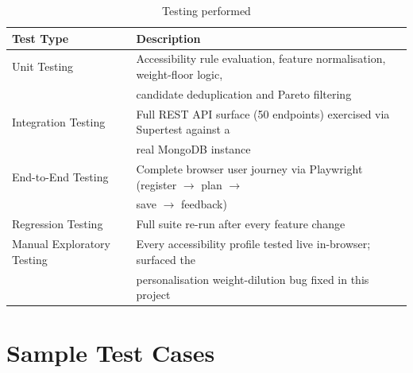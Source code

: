 \documentclass[12pt,a4paper]{report}
\begin{document}
\begin{table}[H]
\centering
\caption{Testing performed}
\begin{tabular}{@{}p{4cm}p{10cm}@{}}
\toprule
\textbf{Test Type} & \textbf{Description} \\
\midrule
Unit Testing & Accessibility rule evaluation, feature normalisation, weight-floor logic, \\
             & candidate deduplication and Pareto filtering \\
Integration Testing & Full REST API surface (50 endpoints) exercised via Supertest against a \\
                     & real MongoDB instance \\
End-to-End Testing & Complete browser user journey via Playwright (register $\to$ plan $\to$ \\
                    & save $\to$ feedback) \\
Regression Testing & Full suite re-run after every feature change \\
Manual Exploratory Testing & Every accessibility profile tested live in-browser; surfaced the \\
                            & personalisation weight-dilution bug fixed in this project \\
\bottomrule
\end{tabular}
\end{table}

\section{Sample Test Cases}
\end{document}
